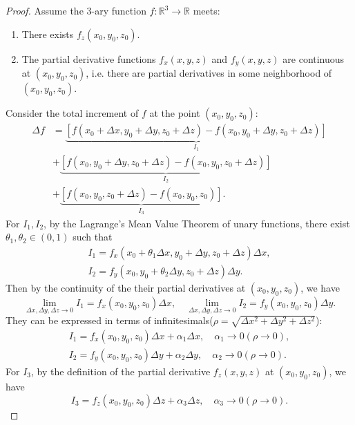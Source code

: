 \documentclass[11pt]{elegantbook}
\begin{document}
\begin{proof}
    Assume the \(3\)-ary function \(f: \mathbb{R}^3 \to \mathbb{R}\) meets:
    \begin{enumerate}
        \item There exists \(f_{z}(x_{0},y_{0},z_{0})\). 
        \item The partial derivative functions \(f_{x}(x,y,z)\) and \(f_{y}(x,y,z)\) are continuous at \((x_{0},y_{0},z_{0})\),
            i.e. there are partial derivatives in some neighborhood of \((x_{0},y_{0},z_{0})\).
    \end{enumerate}
    Consider the total increment of \(f\) at the point \((x_{0},y_{0},z_{0})\):
    \begin{align*}
        \Delta f 
        &= \underbrace{\left[ f(x_0 + \Delta x, y_0 + \Delta y, z_0 + \Delta z) - f(x_0, y_0 + \Delta y, z_0 + \Delta z) \right]}_{I_1}\\
        &+ \underbrace{\left[ f(x_0, y_0 + \Delta y, z_0 + \Delta z) - f(x_0, y_0, z_0 + \Delta z) \right]}_{I_2}\\
        &+ \underbrace{\left[ f(x_0, y_0, z_0 + \Delta z) - f(x_0, y_0, z_0) \right]}_{I_3}.
    \end{align*}
    For \(I_{1}, I_{2}\), by the Lagrange's Mean Value Theorem of unary functions, 
    there exist \(\theta_{1}, \theta_{2} \in (0,1)\) such that
    \begin{gather*}
        I_{1}=f_{x}(x_{0}+\theta_{1}\Delta x,y_{0}+\Delta y,z_{0}+\Delta z)\Delta x,\\
        I_{2}=f_{y}(x_{0},y_{0}+\theta_{2}\Delta y,z_{0}+\Delta z)\Delta y.
    \end{gather*}
    Then by the continuity of the their partial derivatives at \((x_{0},y_{0},z_{0})\), we have
    \[
        \lim_{\Delta x, \Delta y, \Delta z \to 0} I_{1} = f_{x}(x_{0},y_{0},z_{0})\Delta x, \quad
        \lim_{\Delta x, \Delta y, \Delta z \to 0} I_{2} = f_{y}(x_{0},y_{0},z_{0})\Delta y.
    \]
    They can be expressed in terms of infinitesimals(\(\rho = \sqrt{\Delta x^2 + \Delta y^2 + \Delta z^2}\)):
    \begin{align*}
        I_{1}=f_{x}(x_{0},y_{0},z_{0})\Delta x + \alpha_{1}\Delta x, \quad \alpha_{1}\to 0(\rho\to 0),\\
        I_{2}=f_{y}(x_{0},y_{0},z_{0})\Delta y + \alpha_{2}\Delta y, \quad \alpha_{2}\to 0(\rho\to 0).
    \end{align*}
    For \(I_{3}\), by the definition of the partial derivative \(f_{z}(x,y,z)\) at \((x_{0},y_{0},z_{0})\), we have
    \[
        I_{3}=f_{z}(x_{0},y_{0},z_{0})\Delta z + \alpha_{3}\Delta z, \quad \alpha_{3}\to 0(\rho\to 0).
\]
\end{proof}
\end{document}
